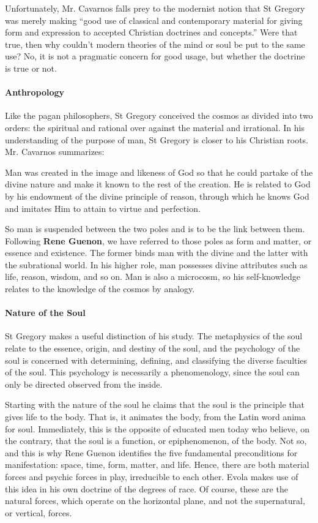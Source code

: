 Unfortunately, Mr. Cavarnos falls prey to the modernist notion that St Gregory was merely making “good use of classical and contemporary material for giving form and expression to accepted Christian doctrines and concepts.” Were that true, then why couldn't modern theories of the mind or soul be put to the same use? No, it is not a pragmatic concern for good usage, but whether the doctrine is true or not.

\paragraph{Anthropology}
Like the pagan philosophers, St Gregory conceived the cosmos as divided into two orders: the spiritual and rational over against the material and irrational. In his understanding of the purpose of man, St Gregory is closer to his Christian roots. Mr. Cavarnos summarizes:

\begin{quotex}
Man was created in the image and likeness of God so that he could partake of the divine nature and make it known to the rest of the creation. He is related to God by his endowment of the divine principle of reason, through which he knows God and imitates Him to attain to virtue and perfection. 

\end{quotex}
So man is suspended between the two poles and is to be the link between them. Following \textbf{Rene Guenon}, we have referred to those poles as form and matter, or essence and existence. The former binds man with the divine and the latter with the subrational world. In his higher role, man possesses divine attributes such as life, reason, wisdom, and so on. Man is also a microcosm, so his self-knowledge relates to the knowledge of the cosmos by analogy.

\paragraph{Nature of the Soul}
St Gregory makes a useful distinction of his study. The metaphysics of the soul relate to the essence, origin, and destiny of the soul, and the psychology of the soul is concerned with determining, defining, and classifying the diverse faculties of the soul. This psychology is necessarily a phenomenology, since the soul can only be directed observed from the inside.

Starting with the nature of the soul he claims that the soul is the principle that gives life to the body. That is, it animates the body, from the Latin word anima for soul. Immediately, this is the opposite of educated men today who believe, on the contrary, that the soul is a function, or epiphenomenon, of the body. Not so, and this is why Rene Guenon identifies the five fundamental preconditions for manifestation: space, time, form, matter, and life. Hence, there are both material forces and psychic forces in play, irreducible to each other. Evola makes use of this idea in his own doctrine of the degrees of race. Of course, these are the natural forces, which operate on the horizontal plane, and not the supernatural, or vertical, forces.

